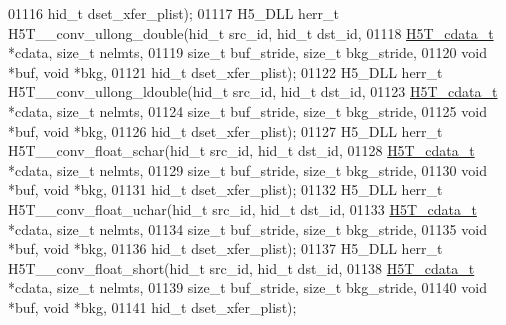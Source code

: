 \begin{DoxyCode}
01116                                      hid\_t dset\_xfer\_plist);
01117 H5\_DLL herr\_t H5T\_\_conv\_ullong\_double(hid\_t src\_id, hid\_t dst\_id,
01118                      \hyperlink{struct_h5_t__cdata__t}{H5T\_cdata\_t} *cdata, \textcolor{keywordtype}{size\_t} nelmts,
01119                      \textcolor{keywordtype}{size\_t} buf\_stride, \textcolor{keywordtype}{size\_t} bkg\_stride,
01120                                      \textcolor{keywordtype}{void} *buf, \textcolor{keywordtype}{void} *bkg,
01121                                      hid\_t dset\_xfer\_plist);
01122 H5\_DLL herr\_t H5T\_\_conv\_ullong\_ldouble(hid\_t src\_id, hid\_t dst\_id,
01123                      \hyperlink{struct_h5_t__cdata__t}{H5T\_cdata\_t} *cdata, \textcolor{keywordtype}{size\_t} nelmts,
01124                      \textcolor{keywordtype}{size\_t} buf\_stride, \textcolor{keywordtype}{size\_t} bkg\_stride,
01125                                      \textcolor{keywordtype}{void} *buf, \textcolor{keywordtype}{void} *bkg,
01126                                      hid\_t dset\_xfer\_plist);
01127 H5\_DLL herr\_t H5T\_\_conv\_float\_schar(hid\_t src\_id, hid\_t dst\_id,
01128                      \hyperlink{struct_h5_t__cdata__t}{H5T\_cdata\_t} *cdata, \textcolor{keywordtype}{size\_t} nelmts,
01129                      \textcolor{keywordtype}{size\_t} buf\_stride, \textcolor{keywordtype}{size\_t} bkg\_stride,
01130                                      \textcolor{keywordtype}{void} *buf, \textcolor{keywordtype}{void} *bkg,
01131                                      hid\_t dset\_xfer\_plist);
01132 H5\_DLL herr\_t H5T\_\_conv\_float\_uchar(hid\_t src\_id, hid\_t dst\_id,
01133                      \hyperlink{struct_h5_t__cdata__t}{H5T\_cdata\_t} *cdata, \textcolor{keywordtype}{size\_t} nelmts,
01134                      \textcolor{keywordtype}{size\_t} buf\_stride, \textcolor{keywordtype}{size\_t} bkg\_stride,
01135                                      \textcolor{keywordtype}{void} *buf, \textcolor{keywordtype}{void} *bkg,
01136                                      hid\_t dset\_xfer\_plist);
01137 H5\_DLL herr\_t H5T\_\_conv\_float\_short(hid\_t src\_id, hid\_t dst\_id,
01138                      \hyperlink{struct_h5_t__cdata__t}{H5T\_cdata\_t} *cdata, \textcolor{keywordtype}{size\_t} nelmts,
01139                      \textcolor{keywordtype}{size\_t} buf\_stride, \textcolor{keywordtype}{size\_t} bkg\_stride,
01140                                      \textcolor{keywordtype}{void} *buf, \textcolor{keywordtype}{void} *bkg,
01141                                      hid\_t dset\_xfer\_plist);

\end{DoxyCode}
